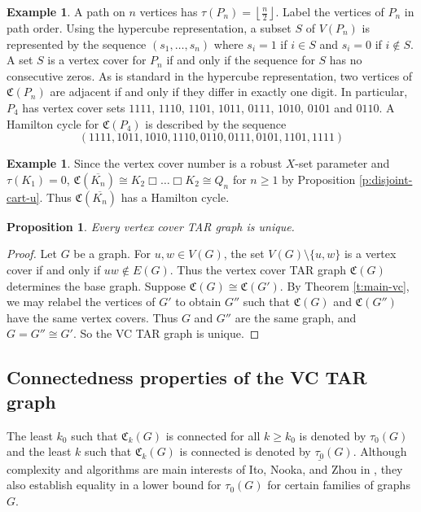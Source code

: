 \documentclass{article}
\numberwithin{figure}{section}
\numberwithin{table}{section}
\numberwithin{equation}{section}
\newtheorem{prop}[thm]{Proposition}
\theoremstyle{definition}
\theoremstyle{definition}
\theoremstyle{definition}
\newtheorem{ex}[thm]{Example}
\newcommand{\bpf}{\begin{proof}}
\newcommand{\epf}{\end{proof}\ms}
\newcommand{\ms}{\medskip}
\newcommand{\ol}{\overline}
\newcommand{\lf}{\left\lfloor}
\newcommand{\rf}{\right\rfloor}
\newcommand{\vc}{\tau}
\newcommand{\vctar}{\mathfrak{C}}%
\newcommand{\vco}{\tau_0}
\newcommand{\ulvco}{\underline{\tau_0}}
\begin{document}
{\begin{ex}
A path on $n$ vertices has $\vc(P_n)=\lf\frac{n}{2}\rf$. Label the vertices of $P_n$ in  path order.  Using the hypercube representation, a subset $S$ of $V(P_n)$ is represented by  the sequence $(s_1, \dots, s_n)$ where $s_i=1$ if $i\in S$ and $s_i=0$ if $i\not\in S$. A set $S$ is a vertex cover  for $P_n$ if and only if the sequence for $S$ has no consecutive zeros.  As is standard in the hypercube representation, two vertices of $\vctar(P_n)$ are adjacent if and only if they differ in exactly one digit.
In particular, $P_4$ has vertex cover sets $1111$, $1110$, $1101$, $1011$, $0111$, $1010$, $0101$ and $0110$.  A Hamilton cycle for $\vctar(P_4)$ is  described by the  sequence 
\[(1111,1011,1010,1110,0110,0111,0101,1101,1111) \]
\end{ex}


\begin{ex}
Since the vertex cover number is a robust $X$-set parameter  and $\vc(K_1)=0$,    $\vctar(\ol{K_n})\cong K_2\Box\dots\Box K_2\cong Q_n$ for $n\ge 1$ by Proposition \ref{p:disjoint- cart-u}.  Thus  $\vctar(\ol{K_n})$ has a Hamilton cycle.
\end{ex}

\begin{prop}\label{p:VCunique} 
Every vertex cover TAR graph is unique.     \end{prop}
\bpf  Let $G$ be a graph.  For $u,w\in V(G)$, the set $V(G)\setminus\{u,w\}$ is a vertex cover if and only if $uw\not\in E(G)$.  Thus the 
vertex cover TAR graph $\vctar(G)$ determines the base graph.
Suppose $\vctar(G)\cong\vctar(G')$.  By Theorem \ref{t:main-vc}, we may relabel the vertices of  $G'$ to obtain $G''$ such that $\vctar(G)$ and 
 $\vctar(G'')$   have the same vertex covers.  Thus  $G$ and $G''$  are the same graph, and $G= G''\cong G'$. So the VC TAR graph is unique.
\epf\vspace{-12pt}






\subsection{Connectedness properties of the VC TAR graph}\label{ss:vc-conn}

   The least $k_0$ such that $\vctar_k(G)$ is connected for all $k\ge k_0$ is denoted by $\vco(G)$  and the least $k$ such that $\vctar_k(G)$ is connected is denoted by $\ulvco(G)$.  Although complexity and algorithms are main interests of Ito, Nooka, and Zhou in \cite{INZ15},  they also establish equality in a lower bound for $\vco(G)$  for certain families of graphs $G$. %

}
\end{document}
